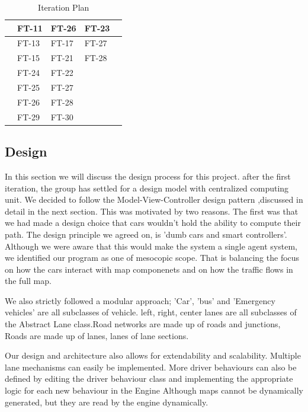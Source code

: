 \documentclass[11pt]{article}
\begin{document}
{\begin{itemize}
\begin{itemize}
\begin{table}[H]
\begin{tabular}{|m{3cm}|m{2cm}|m{2cm}|m{2cm}|m{3cm}|}
		& FT-11 & FT-26 & FT-23 \\ \hline
		
		& FT-13 & FT-17 & FT-27 &\\ \hline
		& FT-15 & FT-21 & FT-28 &\\ \hline
		& FT-24 & FT-22 && \\ \hline
		& FT-25 & FT-27&& \\ \hline
		&FT-26  & FT-28 && \\ \hline
		& FT-29 & FT-30 && \\ \hline
	
		\end{tabular}
		\caption{Iteration Plan}
		\label{table:iteration} 
		\end{table}
		
    
    \end{itemize}

  
	
\subsection{Design}
In this section we will discuss the design process for this project. after the first iteration, the group has settled for a design model with centralized computing unit. We decided to follow the Model-View-Controller design pattern ,discussed in detail in the next section. This was motivated by two reasons. The first was that we had made a design choice that cars wouldn't hold the ability to compute their path. The design principle we agreed on, is 'dumb cars and smart controllers'. Although we were aware that this would make the system a single agent system, we identified our program as one of mesocopic scope. That is balancing the focus on how the cars interact with map componenets and on how the traffic flows in the full map. 

We also strictly followed a modular approach; 'Car', 'bus'  and 'Emergency vehicles' are all subclasses of vehicle. left, right, center lanes are all subclasses of the Abstract Lane class.Road networks are made up of roads and junctions, Roads are made up of lanes, lanes of lane sections.

Our design and architecture also allows for extendability and scalability. Multiple lane mechanisms can easily be implemented. More driver behaviours can also be defined by editing the driver behaviour class and implementing the appropriate logic for each new behaviour in the Engine Although maps cannot be dynamically generated, but they are read by the engine dynamically.
 

\end{itemize}}
\end{document}
